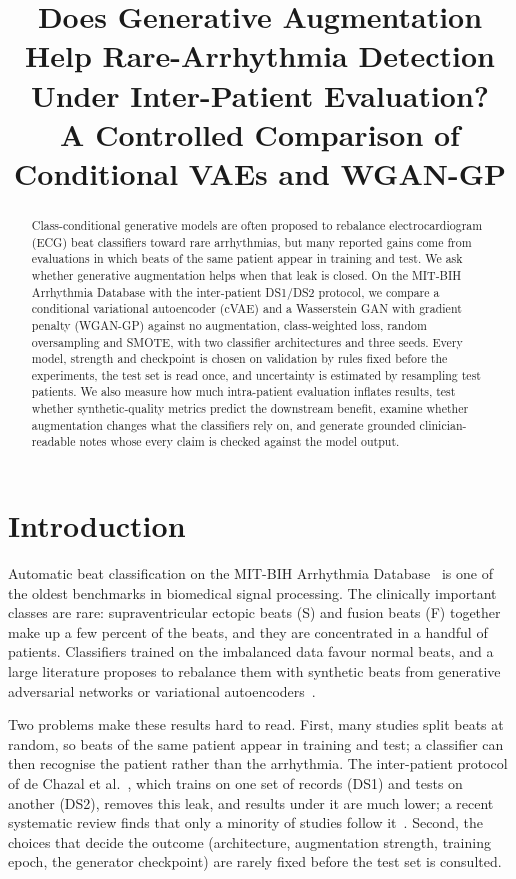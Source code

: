 \documentclass[11pt]{article}
\title{Does Generative Augmentation Help Rare-Arrhythmia Detection Under Inter-Patient Evaluation?\\
A Controlled Comparison of Conditional VAEs and WGAN-GP}
\author{\missing{authors}}
\date{}
\begin{document}
\maketitle

\begin{abstract}
Class-conditional generative models are often proposed to rebalance electrocardiogram (ECG) beat classifiers
toward rare arrhythmias, but many reported gains come from evaluations in which beats of the same patient
appear in training and test. We ask whether generative augmentation helps when that leak is closed. On the
MIT-BIH Arrhythmia Database with the inter-patient DS1/DS2 protocol, we compare a conditional variational
autoencoder (cVAE) and a Wasserstein GAN with gradient penalty (WGAN-GP) against no augmentation,
class-weighted loss, random oversampling and SMOTE, with two classifier architectures and three seeds. Every
model, strength and checkpoint is chosen on validation by rules fixed before the experiments, the test set is
read once, and uncertainty is estimated by resampling test patients. 
We also measure how much intra-patient evaluation inflates results, test whether synthetic-quality metrics
predict the downstream benefit, examine whether augmentation changes what the classifiers rely on, and
generate grounded clinician-readable notes whose every claim is checked against the model output.
\end{abstract}

\section{Introduction}
Automatic beat classification on the MIT-BIH Arrhythmia Database~\cite{moody2001,goldberger2000} is one of the
oldest benchmarks in biomedical signal processing. The clinically important classes are rare:
supraventricular ectopic beats (S) and fusion beats (F) together make up a few percent of the beats, and
they are concentrated in a handful of patients. Classifiers trained on the imbalanced data favour normal
beats, and a large literature proposes to rebalance them with synthetic beats from generative adversarial
networks or variational autoencoders~\cite{delaney2019ecggan,shaker2020gan,adib2022cgan}.

Two problems make these results hard to read. First, many studies split beats at random, so beats of the
same patient appear in training and test; a classifier can then recognise the patient rather than the
arrhythmia. The inter-patient protocol of de Chazal et al.~\cite{dechazal2004}, which trains on one set of
records (DS1) and tests on another (DS2), removes this leak, and results under it are much lower; a recent
systematic review finds that only a minority of studies follow it~\cite{silva2025review}. Second, the
choices that decide the outcome (architecture, augmentation strength, training epoch, the generator
checkpoint) are rarely fixed before the test set is consulted.
\end{document}
